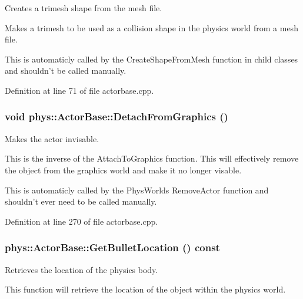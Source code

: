 Creates a trimesh shape from the mesh file. 

Makes a trimesh to be used as a collision shape in the physics world from a mesh file. \par
 This is automaticly called by the CreateShapeFromMesh function in child classes and shouldn't be called manually. 

Definition at line 71 of file actorbase.cpp.

\hypertarget{classphys_1_1ActorBase_acc352d14b6d7f15694ea108ec1c281ec}{
\subsubsection[{DetachFromGraphics}]{\setlength{\rightskip}{0pt plus 5cm}void phys::ActorBase::DetachFromGraphics ()}}
\label{d8/d0f/classphys_1_1ActorBase_acc352d14b6d7f15694ea108ec1c281ec}


Makes the actor invisable. 

This is the inverse of the AttachToGraphics function. This will effectively remove the object from the graphics world and make it no longer visable. \par
 This is automaticly called by the PhysWorlds RemoveActor function and shouldn't ever need to be called manually. 

Definition at line 270 of file actorbase.cpp.

\hypertarget{classphys_1_1ActorBase_a9b32df1efdc346f5d6c0920b959c09a3}{
\subsubsection[{GetBulletLocation}]{ phys::ActorBase::GetBulletLocation () const}}
\label{d8/d0f/classphys_1_1ActorBase_a9b32df1efdc346f5d6c0920b959c09a3}


Retrieves the location of the physics body. 

This function will retrieve the location of the object within the physics world. 

